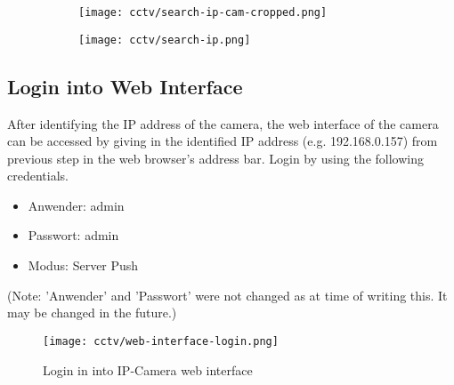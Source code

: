 \begin{figure}[h]
\caption{SearchIPCam.exe}
\label{search-ip-cam-exe}
\centering
	\begin{subfigure}{.49\linewidth}
	\texttt{[image: cctv/search-ip-cam-cropped.png]}
	\end{subfigure}
	\begin{subfigure}{.49\textwidth}
	\texttt{[image: cctv/search-ip.png]}
	\end{subfigure}
\end{figure}

\subsection{Login into Web Interface}
After identifying the IP address of the camera, the web interface of the camera can be accessed by giving in the identified IP address (e.g. 192.168.0.157) from previous step in the web browser's address bar. Login by using the following credentials.
\begin{itemize}
\item Anwender: admin
\item Passwort: admin
\item Modus: Server Push
\end{itemize}
(Note: 'Anwender' and 'Passwort' were not changed as at time of writing this. It may be changed in the future.)

\begin{figure}[h]
\caption{Login in into IP-Camera web interface}
\label{ip-camera-web-interface}
\centering
\texttt{[image: cctv/web-interface-login.png]}
\end{figure}

